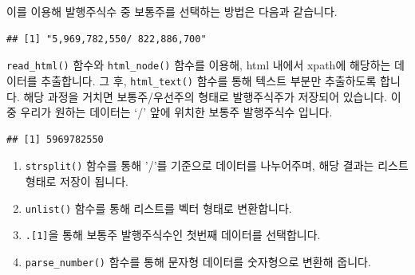 \documentclass[]{book}
\newenvironment{Shaded}{\begin{snugshade}}{\end{snugshade}}
\newcommand{\DataTypeTok}[1]{\textcolor[rgb]{0.13,0.29,0.53}{#1}}
\newcommand{\DecValTok}[1]{\textcolor[rgb]{0.00,0.00,0.81}{#1}}
\newcommand{\KeywordTok}[1]{\textcolor[rgb]{0.13,0.29,0.53}{\textbf{#1}}}
\newcommand{\NormalTok}[1]{#1}
\newcommand{\OperatorTok}[1]{\textcolor[rgb]{0.81,0.36,0.00}{\textbf{#1}}}
\newcommand{\StringTok}[1]{\textcolor[rgb]{0.31,0.60,0.02}{#1}}
\providecommand{\tightlist}{%
  \setlength{\itemsep}{0pt}\setlength{\parskip}{0pt}}
\begin{document}
이를 이용해 발행주식수 중 보통주를 선택하는 방법은 다음과 같습니다.

\begin{Shaded}
\end{Shaded}

\begin{verbatim}
## [1] "5,969,782,550/ 822,886,700"
\end{verbatim}

\texttt{read\_html()} 함수와 \texttt{html\_node()} 함수를 이용해, html 내에서 xpath에 해당하는 데이터를 추출합니다. 그 후, \texttt{html\_text()} 함수를 통해 텍스트 부분만 추출하도록 합니다. 해당 과정을 거치면 보통주/우선주의 형태로 발행주식주가 저장되어 있습니다. 이 중 우리가 원하는 데이터는 `/' 앞에 위치한 보통주 발행주식수 입니다.

\begin{Shaded}
\end{Shaded}

\begin{verbatim}
## [1] 5969782550
\end{verbatim}

\begin{enumerate}
\def\labelenumi{\arabic{enumi}.}
\tightlist
\item
  \texttt{strsplit()} 함수를 통해 '/'를 기준으로 데이터를 나누어주며, 해당 결과는 리스트 형태로 저장이 됩니다.
\item
  \texttt{unlist()} 함수를 통해 리스트를 벡터 형태로 변환합니다.
\item
  \texttt{.{[}1{]}}을 통해 보통주 발행주식수인 첫번째 데이터를 선택합니다.
\item
  \texttt{parse\_number()} 함수를 통해 문자형 데이터를 숫자형으로 변환해 줍니다.
\end{enumerate}
\end{document}
